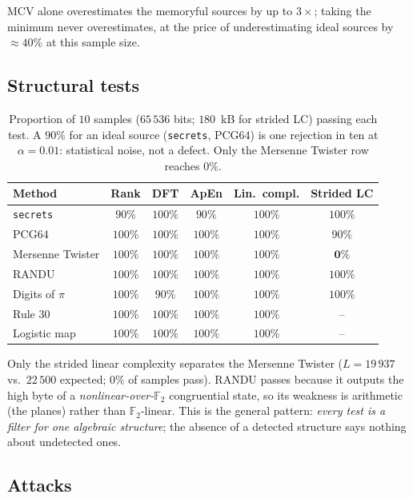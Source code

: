 \documentclass[11pt,a4paper]{article}
\theoremstyle{plain}
\theoremstyle{definition}
\begin{document}
MCV alone overestimates the memoryful sources by up to $3\times$; taking the
minimum never overestimates, at the price of underestimating ideal sources by
$\approx40\%$ at this sample size.

\subsection{Structural tests}

\begin{table}[H]
\centering\small
\begin{tabular}{@{}lccccc@{}}
\toprule
Method & Rank & DFT & ApEn & Lin.\ compl. & \textbf{Strided LC} \\
\midrule
\texttt{secrets} & $90\%$ & $100\%$ & $90\%$ & $100\%$ & $100\%$ \\
PCG64 & $100\%$ & $100\%$ & $100\%$ & $100\%$ & $90\%$ \\
Mersenne Twister & $100\%$ & $100\%$ & $100\%$ & $100\%$ & $\mathbf{0\%}$ \\
RANDU & $100\%$ & $100\%$ & $100\%$ & $100\%$ & $100\%$ \\
Digits of $\pi$ & $100\%$ & $90\%$ & $100\%$ & $100\%$ & $100\%$ \\
Rule 30 & $100\%$ & $100\%$ & $100\%$ & $100\%$ & -- \\
Logistic map & $100\%$ & $100\%$ & $100\%$ & $100\%$ & -- \\
\bottomrule
\end{tabular}
\caption{Proportion of $10$ samples ($65\,536$ bits; $180$~kB for strided LC)
passing each test. A $90\%$ for an ideal source (\texttt{secrets}, PCG64) is one
rejection in ten at $\alpha=0.01$: statistical noise, not a defect. Only the
Mersenne Twister row reaches $0\%$.}
\end{table}

Only the strided linear complexity separates the Mersenne Twister ($L=19\,937$
vs.\ $22\,500$ expected; $0\%$ of samples pass). RANDU passes because it outputs the high byte of a
\emph{nonlinear-over-$\mathbb{F}_2$} congruential state, so its weakness is
arithmetic (the planes) rather than $\mathbb{F}_2$-linear. This is the general
pattern: \emph{every test is a filter for one algebraic structure}; the
absence of a detected structure says nothing about undetected ones.

\subsection{Attacks}
\end{document}
